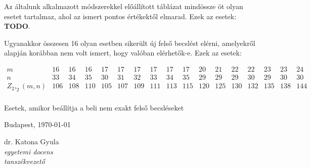 \documentclass[12pt,a4paper]{article}
\begin{document}
Az általunk alkalmazott módszerekkel előállított táblázat mindössze öt olyan esetet tartalmaz, ahol az ismert pontos értékektől elmarad. Ezek az esetek: \textbf{TODO}.

Ugyanakkor összesen 16 olyan esetben sikerült új felső becslést elérni, amelyekről \cite{tan2022zarankiewicz} alapján korábban nem volt ismert, hogy valóban elérhetők-e. Ezek az esetek:
\begin{table}[H]
\[
\begin{array}{c||cccccccccccccccc}
m & 16 & 16 & 16 & 17 & 17 & 17 & 17 & 17 & 17 & 20 & 21 & 22 & 22 & 23 & 23 & 24 \\
n & 33 & 34 & 35 & 30 & 31 & 32 & 33 & 34 & 35 & 29 & 29 & 29 & 30 & 29 & 30 & 30 \\
\hline
Z_2,_2(m,n) & 
106 & 108 & 110 & 105 & 107 & 109 & 111 & 113 & 115 & 
120 & 125 & 130 & 132 & 135 & 138 & 144 \\
\end{array}
\]
\caption{Esetek, amikor beállítja a \cite{tan2022zarankiewicz} beli nem exakt felső becsléseket}
\end{table}

\printbibliography

\vspace{1cm}\vfill
Budapest, \today
\begin{flushright}
\begin{minipage}{0.5\textwidth}
\begin{center}
	dr. Katona Gyula\\
	\textit{egyetemi docens}\\
	\textit{tanszékvezető}
\end{center}
\end{minipage}
\end{flushright}
\vfill
\end{document}
